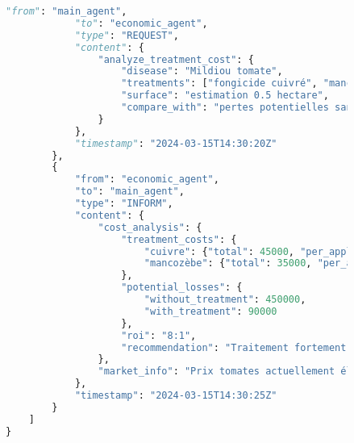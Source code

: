 \begin{figure}[H]
\begin{lstlisting}[language=Python, caption=Exemples de communications inter-agents en action]
            "from": "main_agent",
            "to": "economic_agent",
            "type": "REQUEST",
            "content": {
                "analyze_treatment_cost": {
                    "disease": "Mildiou tomate",
                    "treatments": ["fongicide cuivré", "mancozèbe"],
                    "surface": "estimation 0.5 hectare",
                    "compare_with": "pertes potentielles sans traitement"
                }
            },
            "timestamp": "2024-03-15T14:30:20Z"
        },
        {
            "from": "economic_agent",
            "to": "main_agent",
            "type": "INFORM",
            "content": {
                "cost_analysis": {
                    "treatment_costs": {
                        "cuivre": {"total": 45000, "per_application": 15000},
                        "mancozèbe": {"total": 35000, "per_application": 11500}
                    },
                    "potential_losses": {
                        "without_treatment": 450000,
                        "with_treatment": 90000
                    },
                    "roi": "8:1",
                    "recommendation": "Traitement fortement rentable"
                },
                "market_info": "Prix tomates actuellement élevé (800 FCFA/kg)"
            },
            "timestamp": "2024-03-15T14:30:25Z"
        }
    ]
}


\end{lstlisting}
\end{figure}
